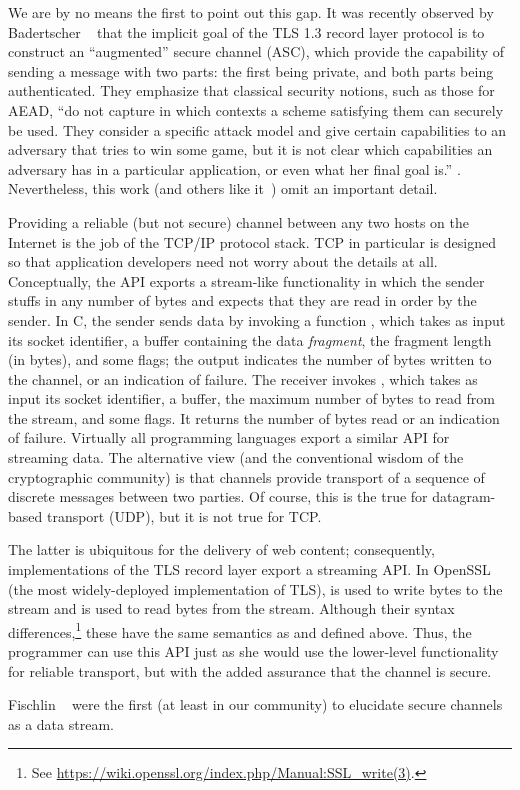 We are by no means the first to point out this gap. It was recently observed by
Badertscher \etal~\cite{BMM+15} that the implicit goal of the TLS 1.3
record layer protocol is to construct an ``augmented'' secure channel (ASC), which
provide the capability of sending a message with two parts: the first being
private, and both parts being authenticated. They emphasize that classical
security notions, such as those for AEAD, ``do not capture in which contexts a
scheme satisfying them can securely be used. They consider a specific attack
model and give certain capabilities to an adversary that tries to win some game,
but it is not \apriori clear which capabilities an adversary has in a
particular application, or even what her final goal is.'' \cite[pp. 2]{BMM+15}.
Nevertheless, this work (and others like it~\cite{BKN02,PRS11}) omit an important
detail.

Providing a reliable (but not secure) channel between any two hosts on the Internet
is the job of the TCP/IP protocol stack. TCP in particular is designed so that
application developers need not worry about the details at all.
%
Conceptually, the API exports a stream-like functionality in which the sender
stuffs in any number of bytes and expects that they are read in order by the
sender.
%
In C, the sender sends data by invoking a function , which
takes as input its socket identifier, a buffer containing the data
\emph{fragment}, the fragment length (in bytes), and some flags; the output
indicates the number of bytes written to the channel, or an indication of
failure. The receiver invokes , which takes as input its socket
identifier, a buffer, the maximum number of bytes to read from the stream, and
some flags. It returns the number of bytes read or an indication of failure.
%
Virtually all programming languages export a similar API for streaming data. The
alternative view (and the conventional wisdom of the cryptographic community) is
that channels provide transport of a sequence of discrete messages between two
parties. Of course, this is the true for datagram-based transport (UDP), but it
is not true for TCP.

The latter is ubiquitous for the delivery of web content; consequently,
implementations of the TLS record layer export a streaming API. In OpenSSL (the
most widely-deployed implementation of TLS),  is used to
write bytes to the stream and  is used to read bytes from
the stream. Although their syntax differences,\footnote{ See
\url{https://wiki.openssl.org/index.php/Manual:SSL_write(3)}.} these have the
same semantics as  and  defined above. Thus,
the programmer can use this API just as she would use the lower-level
functionality for reliable transport, but with the added assurance that the
channel is secure.

Fischlin \etal~\cite{FPMG15} were the first (at least in our community) to
elucidate secure channels as a data stream. 




\ignore{
  \begin{hella}
  \end{cool}
}
